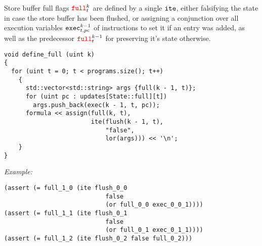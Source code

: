 
\noindent
Store buffer full flags ${\color{red}\texttt{full}}^k_t$ are defined by a single
$\texttt{ite}$, either falsifying the state in case the store buffer has been flushed,
or assigning a conjunction over all execution variables $\texttt{exec}^{k - 1}_{t, pc}$ of  instructions to set it if an entry was added, as well as the predecessor ${\color{red}\texttt{full}}^{k - 1}_t$ for preserving it's state otherwise.

\begin{lstlisting}[style=c++]
void define_full (uint k)
{
  for (uint t = 0; t < programs.size(); t++)
    {
      std::vector<std::string> args {full(k - 1, t)};
      for (uint pc : updates[State::full][t])
        args.push_back(exec(k - 1, t, pc));
      formula << assign(full(k, t),
                        ite(flush(k - 1, t),
                            "false",
                            lor(args))) << '\n';
    }
}
\end{lstlisting}

\noindent
\emph{Example:} 

\begin{lstlisting}[style=smtlib]
(assert (= full_1_0 (ite flush_0_0
                            false
                            (or full_0_0 exec_0_0_1))))
(assert (= full_1_1 (ite flush_0_1
                            false
                            (or full_0_1 exec_0_1_1))))
(assert (= full_1_2 (ite flush_0_2 false full_0_2)))
\end{lstlisting}

